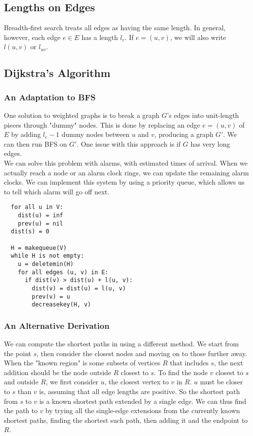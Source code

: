 \subsection{Lengths on Edges}
Breadth-first search treats all edges as having the same length.
In general, however, each edge $e \in E$ has a length $l_e$. If $e = (u, v)$, we will also write $l(u, v)$ or $l_{uv}$.

\subsection{Dijkstra's Algorithm}

\subsubsection{An Adaptation to BFS}
One solution to weighted graphs is to break a graph $G$'s edges into unit-length pieces through "dummy" nodes.
This is done by replacing an edge $e = (u, v)$ of $E$ by adding $l_e - 1$ dummy nodes between $u$ and $v$, producing a graph $G'$.
We can then run BFS on $G'$.
One issue with this approach is if $G$ has very long edges.\\
We can solve this problem with alarms, with estimated times of arrival.
When we actually reach a node or an alarm clock rings, we can update the remaining alarm clocks.
We can implement this system by using a priority queue, which allows us to tell which alarm will go off next. \\
\begin{verbatim}
  for all u in V:
    dist(u) = inf
    prev(u) = nil
  dist(s) = 0

  H = makequeue(V)
  while H is not empty:
    u = deletemin(H)
    for all edges (u, v) in E:
      if dist(v) > dist(u) + l(u, v):
        dist(v) = dist(u) = l(u, v)
        prev(v) = u
        decreasekey(H, v)
\end{verbatim}

\subsubsection{An Alternative Derivation}
We can compute the shortest paths in using a different method.
We start from the point $s$, then consider the closest nodes and moving on to those further away.
When the "known region" is some subsets of vertices $R$ that includes $s$, the next addition should be the node outside $R$ closest to $s$.
To find the node $v$ closest to $s$ and outside $R$, we first consider $u$, the closest vertex to $v$ in $R$.
$u$ must be closer to $s$ than $v$ is, assuming that all edge lengths are positive.
So the shortest path from $s$ to $v$ is a known shortest path extended by a single edge.
We can thus find the path to $v$ by trying all the single-edge extensions from the currently known shortest paths, finding the shortest such path, then adding it and the endpoint to $R$.

